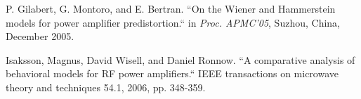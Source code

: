 \documentclass[a4paper,
              ]{jacow}
\begin{document}
\begin{thebibliography}{99}
	P. Gilabert, G. Montoro, and E. Bertran. “On the Wiener and Hammerstein models for power amplifier predistortion.“ 
	in \textit{Proc. APMC’05}, Suzhou, China, December 2005.
	
	Isaksson, Magnus, David Wisell, and Daniel Ronnow. “A comparative analysis of behavioral models for RF power amplifiers.“ 
	IEEE transactions on microwave theory and techniques 54.1, 2006, pp. 348-359.
	

	
\end{thebibliography}

\null 
\end{document}
